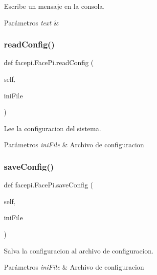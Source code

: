 Escribe un mensaje en la consola. 


\begin{DoxyParams}{Parámetros}
{\em text} & \\
\hline
\end{DoxyParams}
\mbox{\label{classfacepi_1_1_face_pi_a966fe4796c56e70b656ccd92df60cbb9}} 
\subsubsection{\texorpdfstring{read\+Config()}{readConfig()}}
{\footnotesize\ttfamily def facepi.\+Face\+Pi.\+read\+Config (\begin{DoxyParamCaption}\item[{}]{self,  }\item[{}]{ini\+File }\end{DoxyParamCaption})}



Lee la configuracion del sistema. 


\begin{DoxyParams}{Parámetros}
{\em ini\+File} & Archivo de configuracion \\
\hline
\end{DoxyParams}
\mbox{\label{classfacepi_1_1_face_pi_ae6fb3ad150c4edf520d7a6e438af4cd8}} 
\subsubsection{\texorpdfstring{save\+Config()}{saveConfig()}}
{\footnotesize\ttfamily def facepi.\+Face\+Pi.\+save\+Config (\begin{DoxyParamCaption}\item[{}]{self,  }\item[{}]{ini\+File }\end{DoxyParamCaption})}



Salva la configuracion al archivo de configuracion. 


\begin{DoxyParams}{Parámetros}
{\em ini\+File} & Archivo de configuracion \\
\hline
\end{DoxyParams}
\mbox{\label{classfacepi_1_1_face_pi_a28d7a48a53a13bfc501f3ee1de5e1968}} 
